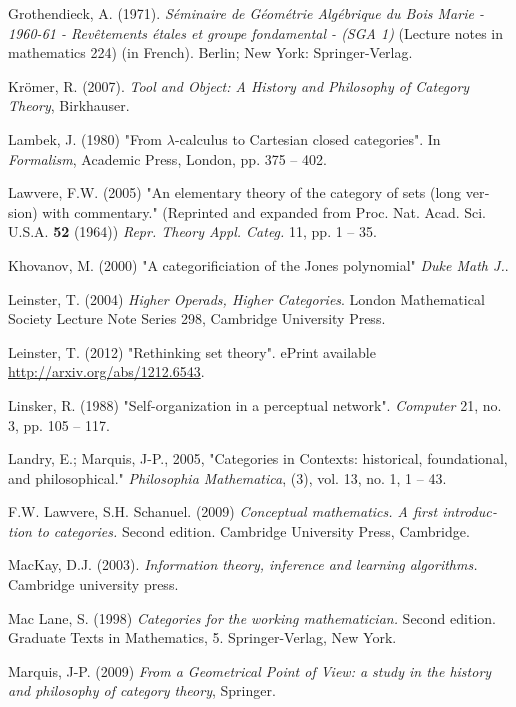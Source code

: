 \documentclass{book}
\theoremstyle{theoremENG}
\theoremstyle{lemmaENG}
\theoremstyle{propositionENG}
\theoremstyle{corollaryENG}
\theoremstyle{factENG}
\theoremstyle{remarkENG}
\theoremstyle{exampleENG}
\theoremstyle{warningENG}
\theoremstyle{questionENG}
\theoremstyle{guessENG}
\theoremstyle{answerENG}
\theoremstyle{constructionENG}
\theoremstyle{rulesENG}
\theoremstyle{excENG}
\theoremstyle{appENG}
\theoremstyle{definitionENG}
\theoremstyle{notationENG}
\theoremstyle{conjectureENG}
\theoremstyle{postulateENG}
\theoremstyle{theoremRUS}
\theoremstyle{lemmaRUS}
\theoremstyle{propositionRUS}
\theoremstyle{corollaryRUS}
\theoremstyle{factRUS}
\theoremstyle{remarkRUS}
\theoremstyle{exampleRUS}
\theoremstyle{warningRUS}
\theoremstyle{questionRUS}
\theoremstyle{guessRUS}
\theoremstyle{answerRUS}
\theoremstyle{constructionRUS}
\theoremstyle{rulesRUS}
\theoremstyle{excRUS}
\theoremstyle{appRUS}
\theoremstyle{definitionRUS}
\theoremstyle{notationRUS}
\theoremstyle{conjectureRUS}
\theoremstyle{postulateRUS}
\begin{document}
\begin{english}
\begin{thebibliography}{SGWB}
 Grothendieck, A. (1971). {\em S\'eminaire de G\'eom\'etrie Alg\'ebrique du Bois Marie - 1960-61 - Rev\^etements \'etales et groupe fondamental - (SGA 1)} (Lecture notes in mathematics 224) (in French). Berlin; New York: Springer-Verlag.

 Kr\"{o}mer, R. (2007). {\em Tool and Object: A History and Philosophy of Category Theory}, Birkhauser.

 Lambek, J. (1980) "From $\lambda$-calculus to Cartesian closed categories". In {\em Formalism}, Academic Press, London, pp. 375 -- 402.

 Lawvere, F.W. (2005) "An elementary theory of the category of sets (long version) with
   commentary." (Reprinted and expanded from Proc. Nat. Acad. Sci. U.S.A. {\bf 52}
   (1964)) {\em Repr. Theory Appl. Categ.} 11, pp. 1 -- 35.
   
 Khovanov, M. (2000) "A categorificiation of the Jones polynomial" {\em Duke Math J.}.

 Leinster, T. (2004) {\em Higher Operads, Higher Categories}. London Mathematical Society Lecture Note Series 298, Cambridge University Press.

 Leinster, T. (2012) "Rethinking set theory". ePrint available \url{http://arxiv.org/abs/1212.6543}.

 Linsker, R. (1988) "Self-organization in a perceptual network". {\em Computer} 21, no. 3, pp. 105 -- 117.

 Landry, E.; Marquis, J-P., 2005, "Categories in Contexts: historical, foundational, and philosophical." {\em Philosophia Mathematica}, (3), vol. 13, no. 1, 1 -- 43.

 F.W. Lawvere, S.H. Schanuel. (2009) {\em Conceptual mathematics. 
A first introduction to categories.} Second edition. Cambridge University Press, Cambridge.

 MacKay, D.J. (2003). {\em Information theory, inference and learning algorithms.} Cambridge university press.

 Mac Lane, S. (1998) {\em Categories for the working mathematician.} Second edition. Graduate Texts in Mathematics, 5. Springer-Verlag, New York.

 Marquis, J-P. (2009) {\em From a Geometrical Point of View: a study in the history and philosophy of category theory}, Springer.


\end{thebibliography}
\end{english}
\end{document}
